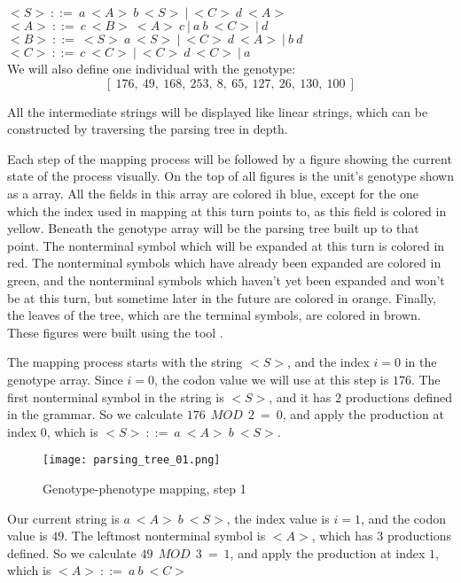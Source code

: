 \noindent
$ {<}S{>}\:::=\:a\:{<}A{>}\:b\:{<}S{>}\:|\:{<}C{>}\:d\:{<}A{>}\:$\\
$ {<}A{>}\:::=\:c\:{<}B{>}\:{<}A{>}\:c\:|\:a\:b\:{<}C{>}\:|\:d $\\
$ {<}B{>}\:::=\:{<}S{>}\:a\:{<}S{>}\:|\:{<}C{>}\:d\:{<}A{>}\:|\:b\:d $\\
$ {<}C{>}\:::=\:c\:{<}C{>}\:|\:{<}C{>}\:d\:{<}C{>}\:|\:a $\\

We will also define one individual with the genotype: 
$$ [\:176,\:49,\:168,\:253,\:8,\:65,\:127,\:26,\:130,\:100\:] $$

All the intermediate strings will be displayed like linear strings, which can be constructed by traversing the parsing tree in depth.

Each step of the mapping process will be followed by a figure showing the current state of the process visually. On the top of all figures is the unit's genotype shown as a array. All the fields in this array are colored ih blue, except for the one which the index used in mapping at this turn points to, as this field is colored in yellow. Beneath the genotype array will be the parsing tree built up to that point. The nonterminal symbol which will be expanded at this turn is colored in red. The nonterminal symbols which have already been expanded are colored in green, and the nonterminal symbols which haven't yet been expanded and won't be at this turn, but sometime later in the future are colored in orange. Finally, the leaves of the tree, which are the terminal symbols, are colored in brown. These figures were built using the tool \citep{diagrams}.

The mapping process starts with the string ${<}S{>}$, and the index $i = 0$ in the genotype array. Since $i = 0$, the codon value we will use at this step is $176$. The first nonterminal symbol in the string is ${<}S{>}$, and it has $2$ productions defined in the grammar. So we calculate $176\:\:MOD\:\:2\:=\:0$, and apply the production at index $0$, which is ${<}S{>}\:::=\:a\:{<}A{>}\:b\:{<}S{>}$.

\begin{figure}[H]
	\centering
	\texttt{[image: parsing\_tree\_01.png]}
	\caption{Genotype-phenotype mapping, step 1}
\end{figure}

Our current string is $a\:{<}A{>}\:b\:{<}S{>}$, the index value is $i = 1$, and the codon value is $49$. The leftmost nonterminal symbol is ${<}A{>}$, which has $3$ productions defined. So we calculate $49\:\:MOD\:\:3\:=\:1$, and apply the production at index $1$, which is ${<}A{>}\:::=\:a\:b\:{<}C{>}$

